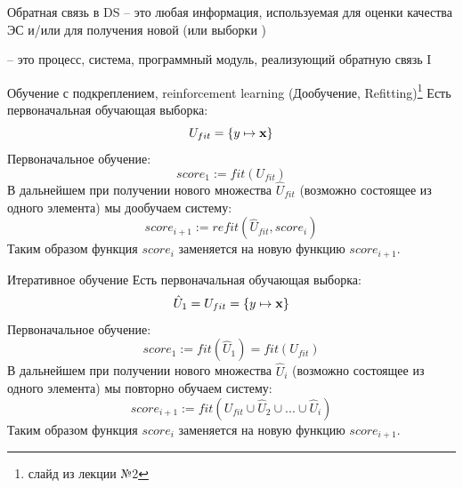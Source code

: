 \begin{frame}{Обратная связь в DS}
	  --
	это любая информация, используемая для оценки качества ЭС
	и/или для получения новой  (или выборки )
	
	 -- это процесс, система, 
	программный модуль, реализующий обратную связь I
\end{frame}

\begin{frame}{Обучение с подкреплением, reinforcement learning (Дообучение, Refitting)\footnote{слайд из лекции №2}}
	\small
	Есть первоначальная обучающая выборка: 
	\begin{equation*}
		U_{fit} = \left\{ y \mapsto \bold x  \right\}
	\end{equation*}
	Первоначальное обучение:
	\begin{equation*}
		score_1 := fit (U_{fit}) 
	\end{equation*} 
	В дальнейшем при получении нового множества $\hat U_{fit}$ (возможно состоящее из одного элемента)
	мы дообучаем систему:
	\begin{equation}
		score_{i+1} := refit (\hat U_{fit}, score_{i}) 
	\end{equation} 
	Таким образом функция $score_i$ заменяется на новую функцию $score_{i+1}$.
\end{frame}

\begin{frame}{Итеративное обучение}
	\small
	Есть первоначальная обучающая выборка: 
	\begin{equation*}
	\hat U_1 = U_{fit} = \left\{ y \mapsto \bold x  \right\}
	\end{equation*}
	Первоначальное обучение:
	\begin{equation*}
	score_1 :=   fit (\hat U_{1}) = fit (U_{fit}) 
	\end{equation*} 
	В дальнейшем при получении нового множества $\hat U_{i}$ (возможно состоящее из одного элемента)
	мы повторно обучаем систему:
	\begin{equation}
	score_{i+1} := fit ( U_{fit} \cup \hat U_2 \cup ... \cup  \hat U_{i}) 
	\end{equation} 
	Таким образом функция $score_i$ заменяется на новую функцию $score_{i+1}$.
\end{frame}

\begin{frame}
\end{frame}

